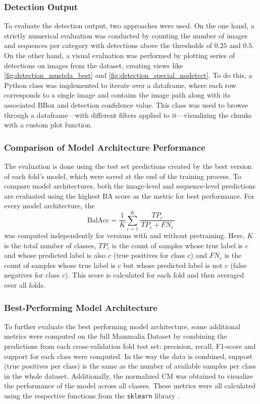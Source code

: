     \subsubsection{Detection Output}
    To evaluate the detection output, two approaches were used.
    On the one hand, a strictly numerical evaluation was conducted by counting the number of images and sequences per category with detections above the thresholds of \(0.25\) and \(0.5\).
    On the other hand, a visual evaluation was performed by plotting series of detections on images from the dataset, creating views like \autoref{fig:detection_mustela_best} and \autoref{fig:detection_special_nodetect}.
    To do this, a Python class was implemented to iterate over a dataframe, where each row corresponds to a single image and contains the image path along with its associated \ac{BBox} and detection confidence value.
    This class was used to browse through a dataframe---with different filters applied to it---visualizing the chunks with a custom plot function.

    \subsubsection{Comparison of Model Architecture Performance}
    The evaluation is done using the test set predictions created by the best version of each fold's model, which were saved at the end of the training process.
    To compare model architectures, both the image-level and sequence-level predictions are evaluated using the highest \ac{BA} score as the metric for best performance.
    For every model architecture, the
    \begin{equation}
        \text{BalAcc} =
        \frac{1}{K} \sum_{c=1}^{K}
        \frac{TP_{c}}{\,TP_{c} + FN_{c}\,}
    \end{equation}
    was computed independently for versions with and without pretraining.
    Here, \(K\) is the total number of classes, \(TP_{c}\) is the count of samples whose true label is \(c\) and whose predicted label is also \(c\) (true positives for class \(c\)) and \(FN_{c}\) is the count of samples whose true label is \(c\) but whose predicted label is not \(c\) (false negatives for class \(c\)).
    This score is calculated for each fold and then averaged over all folds.

    \subsubsection{Best-Performing Model Architecture}
    To further evaluate the best performing model architecture, some additional metrics were computed on the full Mammalia Dataset by combining the predictions from each cross-validation fold test set:
    precision, recall, F1-score and support for each class were computed.
    In the way the data is combined, support (true positives per class) is the same as the number of available samples per class in the whole dataset.
    Additionally, the normalized \ac{CM} was obtained to visualize the performance of the model across all classes.
    These metrics were all calculated using the respective functions from the \texttt{sklearn} library \autocite{pedregosaScikitlearnMachineLearning2011}.

